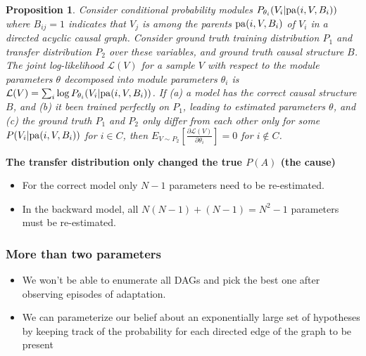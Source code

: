\documentclass{beamer}
\newtheorem{prop}{Proposition}
\begin{document}
\begin{frame}
\begin{prop}
	Consider conditional probability modules $P_{\theta_i}(V_i | {\rm pa}(i,V,B_i))$ where $B_{ij}=1$ indicates that $V_j$ is among the parents ${\rm pa}(i,V,B_i)$ of $V_i$ in a directed acyclic causal graph.
	Consider ground truth training distribution $P_1$ and transfer distribution $P_2$ over these variables, and ground truth causal structure $B$. The joint log-likelihood $\mathcal{L}(V)$ for a sample $V$ with respect to the module parameters $\theta$ decomposed into module parameters $\theta_i$ is \mbox{$\mathcal{L}(V)=\sum_i \log P_{\theta_i}(V_i | {\rm pa}(i,V,B_i))$.} 
	If (a) a model has the correct causal structure $B$, and (b) it been trained perfectly on $P_1$, leading to estimated parameters $\theta$, and (c) the ground truth $P_1$ and $P_2$ only differ from each other only for some $P(V_i | {\rm pa}(i,V,B_i))$ for $i \in C$, then $E_{V\sim P_2}[\frac{\partial \mathcal{L}(V)}{\partial \theta_i}]=0$ for $i \notin C$.
\end{prop}
\end{frame}

\begin{frame}

\textbf{The transfer distribution only changed the true $P(A)$ (the cause)}

\begin{itemize}
\frametitle{Bi-Variate Example}
\item
For the correct model only $N-1$ parameters need to be re-estimated.
\item
In the backward model,  all $N(N-1)+(N-1)=N^2-1$ parameters must be re-estimated.
\end{itemize}
\end{frame}



\begin{frame}
\frametitle{More than two parameters}
\begin{itemize}
\item
We won't be able to enumerate all DAGs and pick the best one after observing episodes of adaptation.
\item 
We can
parameterize our belief about an exponentially large set of hypotheses by keeping track of the probability for
each directed edge of the graph to be present
\end{itemize}
\end{frame}
\end{document}
